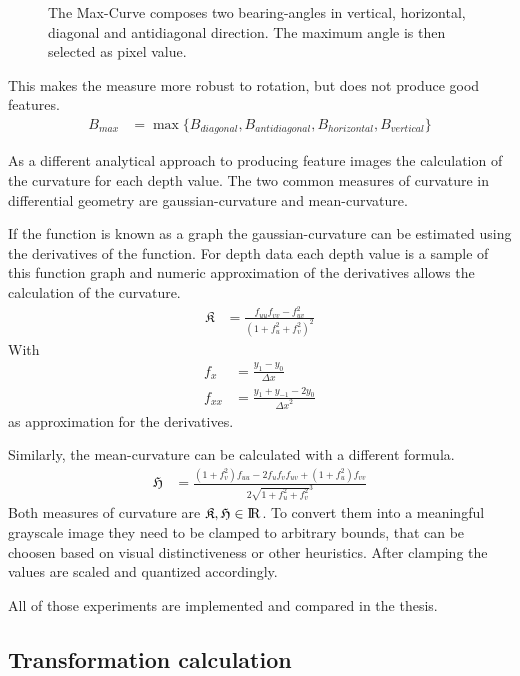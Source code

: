 \begin{figure}
    
    \caption[Schematic Representation of the Max-Curve]{The Max-Curve composes two \Glspl{bearing-angle} in vertical, horizontal, diagonal and antidiagonal direction. The maximum angle is then selected as pixel value.}
\end{figure}

This makes the measure more robust to rotation, but does not produce good features.
\begin{align}
    B_{max} &= \max{\{B_{diagonal}, B_{antidiagonal}, B_{horizontal}, B_{vertical}\}}
\end{align}

As a different analytical approach to producing feature images the calculation of the \gls{curvature} for each depth value.
The two common measures of curvature in differential geometry are \gls{gaussian-curvature} and \gls{mean-curvature}\cite{Kuhnel2008}.

If the function is known as a graph the \Gls{gaussian-curvature} can be estimated using the derivatives of the function.
For depth data each depth value is a sample of this function graph and numeric approximation of the derivatives allows the calculation of the curvature.
\begin{align}
    \mathfrak{K} &= \frac{f_{uu} f_{vv} - f_{uv}^2}{{(1 + f_u^2 + f_v^2)}^2}
\end{align}
With
\begin{align*}
    f_{x} &= \frac{y_1 - y_0}{\Delta x} \\
    f_{xx} &= \frac{y_1 + y_{-1} - 2 y_0}{{\Delta x}^2}
\end{align*}
as approximation for the derivatives.

Similarly, the \Gls{mean-curvature} can be calculated with a different formula.
\begin{align}
    \mathfrak{H} &= \frac{{(1 + f_{v}^2)} f_{uu} - 2 f_u f_v f_{uv} + {(1 + f_u^2)} f_{vv}}{2 \sqrt{1 + f_u^2 + f_v^2}^3}
\end{align}
Both measures of curvature are $\mathfrak{K},\mathfrak{H} \in {\rm I\!R}$.
To convert them into a meaningful grayscale image they need to be clamped to arbitrary bounds, that can be choosen based on visual distinctiveness or other heuristics.
After clamping the values are scaled and quantized accordingly.

All of those experiments are implemented and compared in the thesis.

\subsection{Transformation calculation}\label{transformation-calculation}

